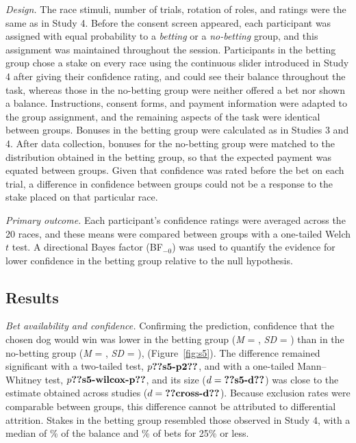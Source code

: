 \documentclass[man,floatsintext,donotrepeattitle]{apa7}
\begin{document}
\textit{Design.} The race stimuli, number of trials, rotation of roles, and ratings were the same as
in Study 4. Before the consent screen appeared, each participant was assigned with equal probability
to a \emph{betting} or a \emph{no-betting} group, and this assignment was maintained throughout the
session. Participants in the betting group chose a stake on every race using the continuous slider introduced in Study 4
after giving their confidence rating, and could see their balance throughout the task, whereas those
in the no-betting group were neither offered a bet nor shown a balance. Instructions, consent forms,
and payment information were adapted to the group assignment, and the remaining aspects of the task
were identical between groups. Bonuses in the betting group were calculated as in Studies 3 and 4.
After data collection, bonuses for the no-betting group were matched to the distribution obtained in
the betting group, so that the expected payment was equated between groups. Given that confidence
was rated before the bet on each trial, a difference in confidence between groups could not be a
response to the stake placed on that particular race.

\textit{Primary outcome.} Each participant's confidence ratings were averaged across the 20 races,
and these means were compared between groups with a one-tailed Welch $t$ test. A directional Bayes
factor (BF$_{-0}$) was used to quantify the evidence for lower confidence in the betting group
relative to the null hypothesis.

\subsection{Results}
\textit{Bet availability and confidence.} Confirming the prediction, confidence that the chosen dog
would win was lower in the betting group (\textit{M} = , \textit{SD} = )
than in the no-betting group (\textit{M} = , \textit{SD} = ),
 (Figure~\ref{fig:s5}). The difference remained significant with a two-tailed test,
$p \res{s5-p2}$, and with a one-tailed Mann--Whitney test, $p \res{s5-wilcox-p}$, and its size
($d = \res{s5-d}$) was close to the estimate obtained across studies ($d = \res{cross-d}$). Because exclusion rates were comparable between groups, this difference cannot be attributed to differential attrition. Stakes in the betting group resembled those observed in
Study 4, with a median of \% of the balance and \% of bets
for 25\% or less.
\end{document}
